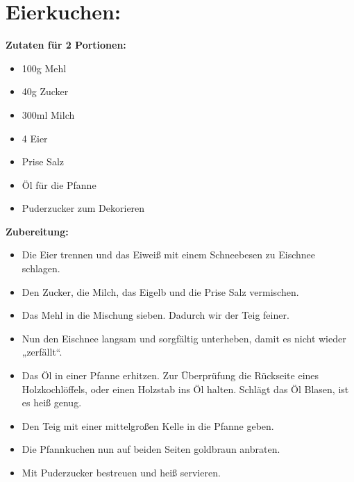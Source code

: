 \section{Eierkuchen:}

\textbf{Zutaten für 2 Portionen:}
\begin{itemize}
  \item 100g Mehl
  \item 40g Zucker
  \item 300ml Milch
  \item 4 Eier
  \item Prise Salz
  \item Öl für die Pfanne
  \item Puderzucker zum Dekorieren
\end{itemize}

\textbf{Zubereitung:}
\begin{itemize}
  \item Die Eier trennen und das Eiweiß mit einem Schneebesen zu Eischnee schlagen.
  \item Den Zucker, die Milch, das Eigelb und die Prise Salz vermischen.
  \item Das Mehl in die Mischung sieben. Dadurch wir der Teig feiner.
  \item Nun den Eischnee langsam und sorgfältig unterheben, damit es nicht wieder „zerfällt“.
  \item Das Öl in einer Pfanne erhitzen. Zur Überprüfung die Rückseite eines Holzkochlöffels, oder einen Holzstab ins Öl halten. Schlägt das Öl Blasen, ist es heiß genug.
  \item Den Teig mit einer mittelgroßen Kelle in die Pfanne geben.
  \item Die Pfannkuchen nun auf beiden Seiten goldbraun anbraten.
  \item Mit Puderzucker bestreuen und heiß servieren.
\end{itemize}
